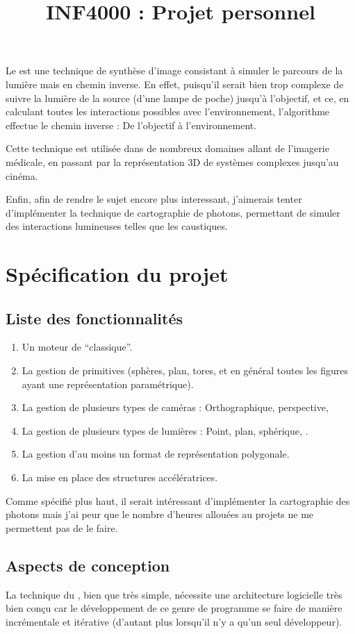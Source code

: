 \documentclass[letter]{article}
\title{INF4000 : Projet personnel}
\newcommand{\raytracing}[0]
{\tsl{ray tracing} }
\begin{document}
\maketitle

Le \raytracing est une technique de synthèse d'image consistant à simuler le
parcours de la lumière mais en chemin inverse. En effet, puisqu'il serait bien
trop complexe de suivre la lumière de la source (\eg d'une lampe de poche)
jusqu'à l'objectif, et ce, en calculant toutes les interactions possibles avec
l'environnement, l'algorithme effectue le chemin inverse : De l'objectif à
l'environnement. 

\newpar Cette technique est utilisée dans de nombreux domaines allant de
l'imagerie médicale, en passant par la représentation 3D de systèmes complexes
jusqu'au cinéma.

\newpar Enfin, afin de rendre le sujet encore plus interessant, j'aimerais
tenter d'implémenter la technique de cartographie de photons, permettant de
simuler des interactions lumineuses telles que les caustiques.

\section{Spécification du projet}
\subsection{Liste des fonctionnalités}
\begin{enumerate}
  \item Un moteur de \raytracing ``classique''. \tick
  \item La gestion de primitives (sphères, plan, tores, et en général toutes
    les figures ayant une représentation paramétrique).
  \item La gestion de plusieurs types de caméras : Orthographique,
    perspective, \etc
  \item La gestion de plusieurs types de lumières : Point, plan, sphérique,
    \etc.
  \item La gestion d'au moins un format de représentation polygonale.
  \item La mise en place des structures accélératrices.
\end{enumerate}

Comme spécifié plus haut, il serait intéressant d'implémenter la cartographie
des photons mais j'ai peur que le nombre d'heures allouées au projets ne
me permettent pas de le faire.

\subsection{Aspects de conception}
La technique du \raytracing, bien que très simple, nécessite une architecture
logicielle très bien conçu car le développement de ce genre de programme se
faire de manière incrémentale et itérative (d'autant plus lorsqu'il n'y a
qu'un seul développeur). 
\end{document}

